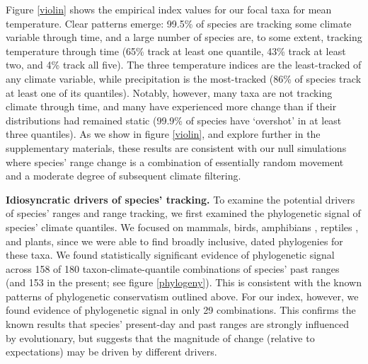 \documentclass[12pt]{report}
\begin{document}
Figure \ref{violin} shows the empirical index values for our focal
taxa for mean temperature. Clear patterns emerge: 99.5\% of species
are tracking some climate variable through time, and a large number of
species are, to some extent, tracking temperature through time (65\%
track at least one quantile, 43\% track at least two, and 4\% track
all five). The three temperature indices are the least-tracked of any
climate variable, while precipitation is the most-tracked (86\% of
species track at least one of its quantiles). Notably, however, many
taxa are not tracking climate through time, and many have experienced
more change than if their distributions had remained static (99.9\% of
species have `overshot' in at least three quantiles). As we show in
figure \ref{violin}, and explore further in the supplementary
materials, these results are consistent with our null simulations
where species' range change is a combination of essentially random
movement and a moderate degree of subsequent climate filtering.

\textbf{Idiosyncratic drivers of species' tracking.} To examine the
potential drivers of species' ranges and range tracking, we first
examined the phylogenetic signal of species' climate quantiles. We
focused on mammals\supercite{Faurby2015}, birds\supercite{Jetz2012},
amphibians \supercite{Jetz2018}, reptiles \supercite{Zheng2016}, and
plants\supercite{Smith2018}, since we were able to find broadly
inclusive, dated phylogenies for these taxa. We found statistically
significant evidence of phylogenetic signal across 158 of 180
taxon-climate-quantile combinations of species' past ranges (and 153
in the present; see figure \ref{phylogeny}). This is consistent with
the known patterns of phylogenetic conservatism outlined above. For
our index, however, we found evidence of phylogenetic signal in only
29 combinations. This confirms the known results that species'
present-day and past ranges are strongly influenced by evolutionary,
but suggests that the magnitude of change (relative to expectations)
may be driven by different drivers.
\end{document}
